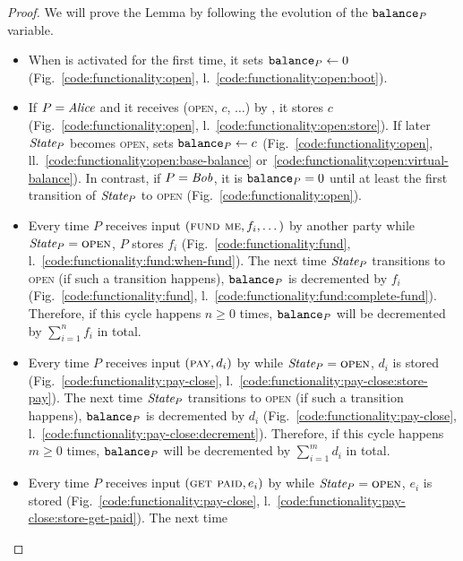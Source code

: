 \begin{proof}
  We will prove the Lemma by following the evolution of the $\texttt{balance}_{P}$
  variable.
  \begin{itemize}
    \item When \fchan is activated for the first time, it sets $\texttt{balance}_{P}
    \gets 0$ (Fig.~\ref{code:functionality:open},
    l.~\ref{code:functionality:open:boot}). \item If $P = \mathit{Alice}$ and it
    receives (\textsc{open}, $c$, $\dots$) by \environment, it stores $c$
    (Fig.~\ref{code:functionality:open},
    l.~\ref{code:functionality:open:store}). If later $\itistate_P$ becomes
    \textsc{open}, \fchan sets $\texttt{balance}_{P} \gets c$
    (Fig.~\ref{code:functionality:open},
    ll.~\ref{code:functionality:open:base-balance}
    or~\ref{code:functionality:open:virtual-balance}). In contrast, if $P =
    \mathit{Bob}$, it is $\texttt{balance}_{P} = 0$ until at least the first transition of
    $\itistate_P$ to \textsc{open} (Fig.~\ref{code:functionality:open}).
    \item Every time $P$ receives input $(\textsc{fund me}, f_i, \dots)$ by
    another party while $\itistate_P = \textsc{open}$, $P$ stores $f_i$
    (Fig.~\ref{code:functionality:fund},
    l.~\ref{code:functionality:fund:when-fund}). The next time $\itistate_P$
    transitions to \textsc{open} (if such a transition happens), $\texttt{balance}_{P}$
    is decremented by $f_i$ (Fig.~\ref{code:functionality:fund},
    l.~\ref{code:functionality:fund:complete-fund}). Therefore, if this cycle
    happens $n \geq 0$ times, $\texttt{balance}_{P}$ will be decremented by
    $\sum\limits_{i=1}^n f_i$ in total.
    \item Every time $P$ receives input $(\textsc{pay}, d_i)$ by \environment
    while $\itistate_P = \textsc{open}$, $d_i$ is stored
    (Fig.~\ref{code:functionality:pay-close},
    l.~\ref{code:functionality:pay-close:store-pay}). The next time
    $\itistate_P$ transitions to \textsc{open} (if such a transition happens),
    $\texttt{balance}_{P}$ is decremented by $d_i$
    (Fig.~\ref{code:functionality:pay-close},
    l.~\ref{code:functionality:pay-close:decrement}). Therefore, if this cycle
    happens $m \geq 0$ times, $\texttt{balance}_{P}$ will be decremented by
    $\sum\limits_{i=1}^m d_i$ in total.
    \item Every time $P$ receives input $(\textsc{get paid}, e_i)$ by
    \environment while $\itistate_P = \textsc{open}$, $e_i$ is stored
    (Fig.~\ref{code:functionality:pay-close},
    l.~\ref{code:functionality:pay-close:store-get-paid}). The next time

\end{itemize}
\end{proof}
